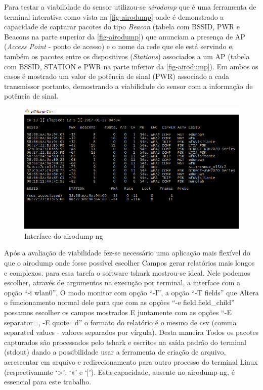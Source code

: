 Para testar a viabilidade do sensor utilizou-se \emph{airodump} que é uma
ferramenta de terminal interativa como vista na \autoref{fig-airodump} onde é
demonstrado a capacidade de capturar pacotes do tipo \emph{Beacon} (tabela com
BSSID, PWR e Beacons na parte superior da \autoref{fig-airodump}) que anunciam
a presença de AP (\emph{Access Point} - ponto de acesso) e o nome da rede que
ele está servindo e, também os pacotes entre os dispositivos (\emph{Stations})
associados a um AP (tabela com BSSID, STATION e PWR na parte inferior da
\autoref{fig-airodump}). Em ambos os casos é mostrado um valor de potência de
sinal (PWR) associado a cada transmissor portanto, demostrando a viabilidade
do sensor com a informação de potência de sinal.

\begin{figure}[htb]
	\caption{\label{fig-airodump}Interface do airodump-ng}
	\begin{center}
	\includegraphics[width=1\textwidth]{040-plataformas/RPi-WiFi-dongles/wifi-sniff-rpi/4-rpi-airodump.png}
	\end{center}
\end{figure}


Após a avaliação de viabilidade fez-se necessário uma aplicação mais flexível do que
o airodump onde fosse possível escolher Campos gerar relatórios mais longos e complexos.
para essa tarefa o software tshark mostrou-se ideal. Nele podemos escolher, através de
argumentos na execução por terminal, a interface com a opção “-i wlan0”, O modo monitor
com opção “-I”, a opção “-T fields” que Altera o funcionamento normal dele para que com
as opções “-e field.field\_child” possamos escolher os campos mostrados E juntamente
com as opções “-E separator=, -E quote=d” o formato do relatório é o mesmo de csv
(comma separated values - valores separados por vírgula). Desta maneira Todos os pacotes
capturados são processados pelo tshark e escritos na saída padrão do terminal (stdout)
dando a possibilidade usar a ferramenta de criação de arquivo, acrescentar em arquivo e
redirecionamento para outro processo do terminal Linux (respectivamnte ‘>’, ‘»’ e ‘|’). Esta
capacidade, ausente no airodump-ng, é essencial para este trabalho.

